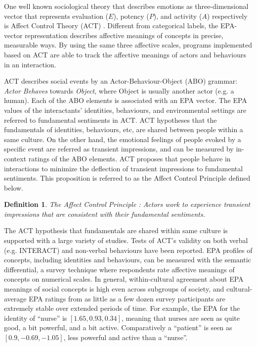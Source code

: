 One well known sociological theory that describes emotions as three-dimensional vector that represents evaluation ($E$), potency ($P$), and activity ($A$) respectively is Affect Control Theory (ACT) \cite{robinson2006affect}. Different from categorical labels, the EPA-vector representation describes affective meanings of concepts in precise, measurable ways. By using the same three affective scales, programs implemented based on ACT are able to track the affective meanings of actors and behaviours in an interaction.

ACT describes social events by an Actor-Behaviour-Object (ABO) grammar: \textit{Actor Behaves} towards \textit{Object}, where Object is usually another actor (e.g. a human). Each of the ABO elements is associated with an EPA vector. The EPA values of the interactants' identities, behaviours, and environmental settings are referred to fundamental sentiments in ACT. ACT hypotheses that the fundamentals of identities, behaviours, etc, are shared between people within a same culture. On the other hand, the emotional feelings of people evoked by a specific event are referred as transient impressions, and can be measured by in-context ratings of the ABO elements. ACT proposes that people behave in interactions to minimize the deflection of transient impressions to fundamental sentiments. This proposition is referred to as the Affect Control Principle defined below.

\newtheorem{def-act}{Definition}
\begin{def-act}
\label{def:act}
The Affect Control Principle \cite{robinson2006affect}: Actors work to experience transient impressions that are consistent with their fundamental sentiments.
\end{def-act}

The ACT hypothesis that fundamentals are shared within same culture is supported with a large variety of studies. Tests of ACT's validity on both verbal (e.g. INTERACT) and non-verbal behaviours \cite{schroder2013culture} have been reported. EPA profiles of concepts, including identities and behaviours, can be measured with the semantic differential, a survey technique where respondents rate affective meanings of concepts on numerical scales. In general, within-cultural agreement about EPA meanings of social concepts is high even across subgroups of society, and cultural-average EPA ratings from as little as a few dozen survey participants are extremely stable over extended periods of time. For example, the EPA for the identity of ``nurse'' is $[1.65, 0.93, 0.34]$, meaning that nurses are seen as quite good, a bit powerful, and a bit active. Comparatively a ``patient'' is seen as $[0.9, -0.69, -1.05]$, less powerful and active than a ``nurse''.

